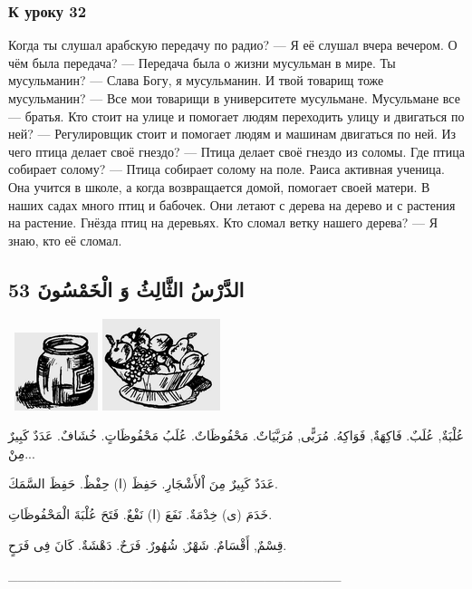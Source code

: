 \documentclass[a5paper]{article}
\begin{document}
\subsubsection{К уроку 32}
Когда ты слушал арабскую передачу по радио? — Я её слушал вчера вечером. О чём была передача? — Передача была о жизни мусульман в мире. Ты мусульманин? — Слава Богу, я мусульманин. И твой товарищ тоже мусульманин? — Все мои товарищи в университете мусульмане. Мусульмане все — братья. Кто стоит на улице и помогает людям переходить улицу и двигаться по ней? — Регулировщик стоит и помогает людям и машинам двигаться по ней. Из чего птица делает своё гнездо? — Птица делает своё гнездо из соломы. Где птица собирает солому? — Птица собирает солому на поле. Раиса активная ученица. Она учится в школе, а когда возвращается домой, помогает своей матери. В наших садах много птиц и бабочек. Они летают с дерева на дерево и с растения на растение. Гнёзда птиц на деревьях. Кто сломал ветку нашего дерева? — Я знаю, кто её сломал.

\subsection{الدَّرْسُ الثَّالِثُ وَ الْخَمْسُونَ 53}
\  \includegraphics[width=0.9583in,height=0.8957in]{images/MuhammadBagauddinprettified-img174.png}   \includegraphics[width=1.3543in,height=1.052in]{images/MuhammadBagauddinprettified-img175.png} 

عُلْبَةٌ, عُلَبٌ. فَاكِهَةٌ, فَوَاكِهُ. مُرَبًّى, مُرَبَّيَاتٌ. مَحْفُوظَاتٌ. عُلَبُ مَحْفُوظَاتٍ. خُشَافٌ. عَدَدٌ كَبِيرٌ مِنْ... 

عَدَدٌ كَبِيرٌ مِنَ اْلأَشْجَارِ. حَفِظَ (ا) حِفْظٌ. حَفِظَ السَّمَكَ. 

خَدَمَ (ى) خِدْمَةٌ. نَفَعَ (ا) نَفْعٌ. فَتَحَ عُلْبَةَ الْمَحْفُوظَاتِ. 

قِسْمٌ, أَقْسَامٌ. شَهْرٌ, شُهُورٌ. فَرَحٌ. دَهْشَةٌ. كَانَ فِى فَرَحٍ.

\_\_\_\_\_\_\_\_\_\_\_\_\_\_\_\_\_\_\_\_\_\_\_\_\_\_\_\_\_\_\_\_\_\_\_
\end{document}
